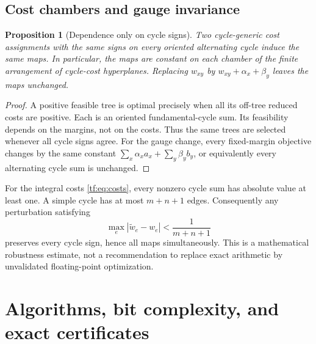 \documentclass[11pt]{article}
\numberwithin{equation}{section}
\newtheorem{proposition}[theorem]{Proposition}
\theoremstyle{definition}
\begin{document}
\subsection{Cost chambers and gauge invariance}

\begin{proposition}[Dependence only on cycle signs]
\label{tf:prop:chambers}
Two cycle-generic cost assignments with the same signs on every oriented
alternating cycle induce the same maps. In particular, the maps are
constant on each chamber of the finite arrangement of cycle-cost
hyperplanes. Replacing $w_{xy}$ by $w_{xy}+\alpha_x+\beta_y$ leaves the
maps unchanged.
\end{proposition}
\begin{proof}
A positive feasible tree is optimal precisely when all its off-tree
reduced costs are positive. Each is an oriented fundamental-cycle sum.
Its feasibility depends on the margins, not on the costs. Thus the same
trees are selected whenever all cycle signs agree. For the gauge change,
every fixed-margin objective changes by the same constant
$\sum_x\alpha_xa_x+\sum_y\beta_yb_y$, or equivalently every alternating
cycle sum is unchanged.
\end{proof}

For the integral costs \eqref{tf:eq:costs}, every nonzero cycle sum has
absolute value at least one. A simple cycle has at most $m+n+1$ edges.
Consequently any perturbation satisfying
\begin{equation}
 \max_e|\widetilde w_e-w_e|<\frac{1}{m+n+1}
 \label{tf:eq:costradius}
\end{equation}
preserves every cycle sign, hence all maps simultaneously. This is a
mathematical robustness estimate, not a recommendation to replace exact
arithmetic by unvalidated floating-point optimization.

\section{Algorithms, bit complexity, and exact certificates}
\label{tf:sec:algorithms}
\end{document}
